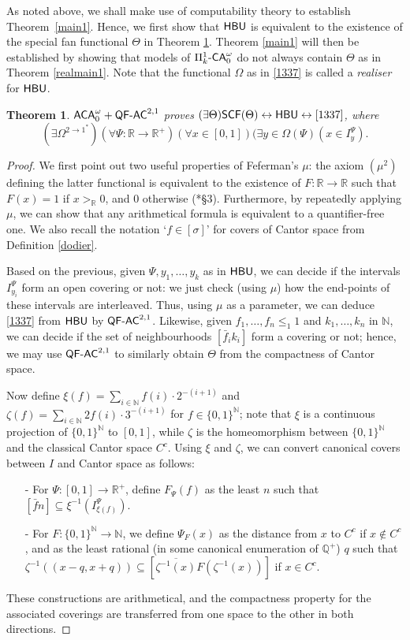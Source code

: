 \documentclass[reqno]{amsart}
\newtheorem{thm}{Theorem}
\newcommand\be{\begin{equation}}
\newcommand\ee{\end{equation}}
\def\SIXK{\Pi_{k}^{1}\text{-\textsf{\textup{CA}}}_{0}^{\omega}}
\def\ACAo{\textup{\textsf{ACA}}_{0}^{\omega}}
\def\N{{\mathbb  N}}
\def\Q{{\mathbb  Q}}
\def\R{{\mathbb  R}}
\def\di{\rightarrow}
\def\asa{\leftrightarrow}
\def\QFAC{\textup{\textsf{QF-AC}}}
\def\HBU{\textup{\textsf{HBU}}}
\def\SCF{\textup{\textsf{SCF}}}
\numberwithin{equation}{section}
\numberwithin{thm}{section}
\begin{document}
As noted above, we shall make use of computability theory to establish Theorem~\ref{main1}.  
Hence, we first show that $\HBU$ is equivalent to the existence of the special fan functional $\Theta$ in Theorem \ref{nolapdog}.  Theorem \ref{main1} will then be established
by showing that models of $\SIXK$ do not always contain $\Theta$ as in Theorem \ref{realmain1}.  Note that the functional $\Omega$ as in \eqref{1337} is called a \emph{realiser} for $\HBU$.
\begin{thm}\label{nolapdog}
$\ACAo+\QFAC^{2,1}$ proves $(\exists \Theta)\SCF(\Theta)\asa \HBU \asa \eqref{1337}$, where
\be\label{1337}
(\exists \Omega^{2\di 1^{*}})(\forall \Psi:\R\di \R^{+})(\forall x\in [0,1])(\exists y\in \Omega(\Psi)(x\in I_{y}^{\Psi}).
\ee
\end{thm}
\begin{proof}
We first point out two useful properties of Feferman's $\mu$: the axiom $(\mu^{2})$ defining the latter functional is equivalent to the existence of $F:\R\di\R$ such that $F(x)=1$ if $x>_{\R}0$, and $0$ otherwise (\cite{kohlenbach2}*{\S3}).  Furthermore, by repeatedly applying $\mu$, we can show that any arithmetical formula is equivalent to a quantifier-free one.  We also recall the notation `$f\in [\sigma]$' for covers of Cantor space from Definition \ref{dodier}.  

\smallskip 
 
Based on the previous, given $\Psi,y_1 , \ldots , y_k$ as in $\HBU$, we can decide if the intervals $I^\Psi_{y_i}$ form an open covering or not: we just check (using $\mu$) how the end-points of these intervals are interleaved.  Thus, using $\mu$ as a parameter, we can deduce \eqref{1337} from $\HBU$ by $\QFAC^{2,1}$. Likewise, given $f_1 , \ldots , f_n\leq_{1}1$ and $k_1 , \ldots ,k_n$ in $\N$, we can decide if the set of neighbourhoods $[\bar f_ik_i]$ form a covering or not; hence, we may use $\QFAC^{2,1}$ to similarly obtain $\Theta$ from the compactness of Cantor space.

\smallskip

Now define $\xi(f) = \sum_{i \in \N}f(i)\cdot 2^{-(i+1)}$ and $\zeta(f) = \sum_{i \in \N}2f(i)\cdot 3^{-(i+1)}$ for $f\in \{0,1\}^{\N}$; note that $\xi$ is a continuous projection of $\{0,1\}^\N$ to $[0,1]$, while $\zeta$ is the homeomorphism between $\{0,1\}^\N$ and the classical Cantor space $C^c$.  Using $\xi$ and $\zeta$, we can convert canonical covers between $I$ and Cantor space as follows:  
\begin{itemize}
\item[-] For $\Psi:[0,1] \rightarrow \R^+$, define $F_\Psi(f)$ as the least $n$ such that $[\bar f n] \subseteq \xi^{-1}(I_{\xi(f)}^\Psi)$.
\item[-] For $F:\{0,1\}^\N \rightarrow \N$, we define $\Psi_F(x)$ as the distance from $x$ to $C^c$ if $x \not \in C^c$, and as the least rational (in some canonical enumeration of $\Q^+$) $q$ such that $\zeta^{-1}((x - q,x+q)) \subseteq [\overline{\zeta^{-1}(x)}F(\zeta^{-1}(x))]$ if $x \in C^c$.
\end{itemize}
These constructions are arithmetical, and the compactness property for the associated coverings are transferred from one space to the other in both directions.
\end{proof}
\end{document}
